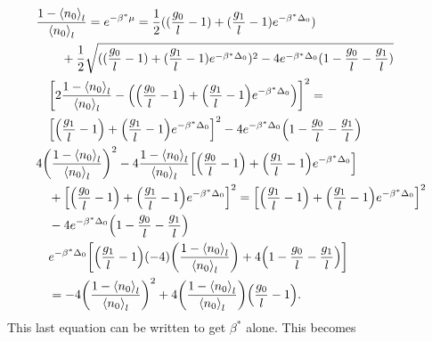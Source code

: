 \begin{align}
    &\frac{1-\left<{n_0}\right>_l}{\left<{n_0}\right>_l}=e^{-\beta^*\mu }=\frac{1}{2}((\frac{g_0}{l}-1)+(\frac{g_1}{l}-1)e^{-\beta^*\Delta_0})\\
    &\quad\quad +\frac{1}{2}\sqrt{((\frac{g_0}{l}-1)+(\frac{g_1}{l}-1)e^{-\beta^*\Delta_0})^2-4e^{-\beta^*\Delta_0}(1-\frac{g_0}{l}-\frac{g_1}{l})} \nonumber\\
    &\quad\qty[2\frac{1-\left<{n_0}\right>_l}{\left<{n_0}\right>_l}-\qty(\qty(\frac{g_0}{l}-1)+\qty(\frac{g_1}{l}-1)e^{-\beta^*\Delta_0})]^2=\nonumber\\
    &\quad\qty[\qty(\frac{g_1}{l}-1)+\qty(\frac{g_1}{l}-1)e^{-\beta^*\Delta_0}]^2-4e^{-\beta^*\Delta_0} \qty(1-\frac{g_0}{l}-\frac{g_1}{l})\\
    &4\qty(\frac{1-\left<{n_0}\right>_l}{\left<{n_0}\right>_l})^2-4 \frac{1-\left<{n_0}\right>_l}{\left<{n_0}\right>_l} \qty[\qty(\frac{g_0}{l}-1)+\qty(\frac{g_1}{l}-1)e^{-\beta^*\Delta_0}]\nonumber\\
    &\quad+\qty[\qty(\frac{g_0}{l}-1)+\qty(\frac{g_1}{l}-1)e^{-\beta^*\Delta_0}]^2= \qty[\qty(\frac{g_1}{l}-1)+\qty(\frac{g_1}{l}-1)e^{-\beta^*\Delta_0}]^2\nonumber\\
    &\quad -4e^{-\beta^*\Delta_0} \qty(1-\frac{g_0}{l}-\frac{g_1}{l})\nonumber\\
    &\quad e^{-\beta^*\Delta_0}\qty[\qty(\frac{g_1}{l}-1)(-4)\qty(\frac{1-\left<{n_0}\right>_l}{\left<{n_0}\right>_l})+4\qty(1-\frac{g_0}{l}-\frac{g_1}{l})]\nonumber\\
    &\quad =-4\qty(\frac{1-\left<{n_0}\right>_l}{\left<{n_0}\right>_l})^2+4\qty(\frac{1-\left<{n_0}\right>_l}{\left<{n_0}\right>_l})\qty(\frac{g_0}{l}-1).
\end{align}
This last equation can be written to get $\beta^*$ alone. This becomes 
